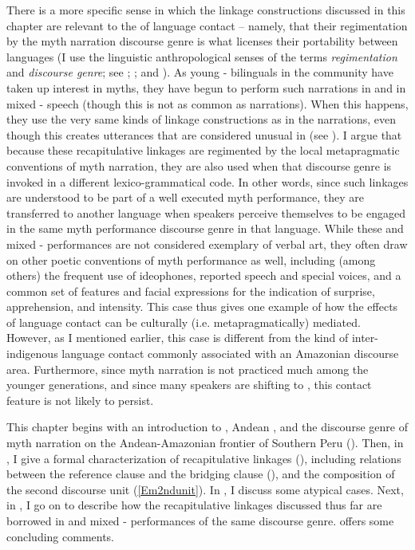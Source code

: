 \documentclass[output=paper]{LSP/langsci}
\begin{document}
There is a more specific sense in which the  linkage constructions discussed in this chapter are relevant to the  of language contact – namely, that their regimentation by the myth narration discourse genre is what licenses their portability between languages (I use the linguistic anthropological senses of the terms \textit{regimentation} and \textit{discourse genre}; see \citealt{briggs.1992}; \citealt{silverstein93}; and ). As young - bilinguals in the community have taken up interest in myths, they have begun to perform such narrations in  and in mixed - speech (though this is not as common as  narrations). When this happens, they use the very same kinds of linkage constructions as in the  narrations, even though this creates utterances that are considered unusual in  (see ). I argue that because these recapitulative linkages are regimented by the local metapragmatic conventions of myth narration, they are also used when that discourse genre is invoked in a different lexico-grammatical code. In other words, since such linkages are understood to be part of a well executed myth performance, they are transferred to another language when speakers perceive themselves to be engaged in the same myth performance discourse genre in that language. While these  and mixed - performances are not considered exemplary of  verbal art, they often draw on other poetic conventions of  myth performance as well, including (among others) the frequent use of ideophones, reported speech and special voices, and a common set of  features and facial expressions for the indication of surprise, apprehension, and intensity. This case thus gives one example of how the effects of language contact can be culturally (i.e. metapragmatically) mediated. However, as I mentioned earlier, this case is different from the kind of inter-indigenous language contact commonly associated with an Amazonian discourse area. Furthermore, since myth narration is not practiced much among the younger generations, and since many  speakers are shifting to , this contact feature is not likely to persist.
 
This chapter begins with an introduction to , Andean , and the discourse genre of myth narration on the Andean-Amazonian frontier of Southern Peru (). Then, in , I give a formal characterization of recapitulative linkages (), including relations between the reference clause and the bridging clause (), and the composition of the second discourse unit (\ref{Em2ndunit}). In , I discuss some atypical cases. Next, in , I go on to describe how the  recapitulative linkages discussed thus far are borrowed in  and mixed - performances of the same discourse genre.  offers some concluding comments.
%
\end{document}
